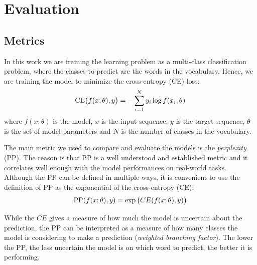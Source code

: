 
\section{Evaluation}
\label{sec:5_eval}
\subsection{Metrics}
In this work we are framing the learning problem as a multi-class classification problem, where the classes to predict are the words in the vocabulary. Hence, we are training the model to minimize the cross-entropy (CE) loss:
\begin{equation}
    \text{CE} \parenth[\big]{f(x; \theta), y} = -\sum_{i=1}^{N} y_i \log{f(x_i; \theta)}
\end{equation}
where $f(x; \theta)$ is the model, $x$ is the input sequence, $y$ is the target sequence, $\theta$ is the set of model parameters and $N$ is the number of classes in the vocabulary. 

The main metric we used to compare and evaluate the models is the \emph{perplexity} (PP). The reason is that PP is a well understood and established metric and it correlates well enough with the model performances on real-world tasks. Although the PP can be defined in multiple ways, it is convenient to use the definition of PP as the exponential of the cross-entropy (CE):
\begin{equation}
    \text{PP}(f(x; \theta), y) = \exp \parenth[\big]{CE(f(x; \theta), y)}
\end{equation}

While the $CE$ gives a measure of how much the model is uncertain about the prediction, the PP can be interpreted as a measure of how many classes the model is considering to make a prediction (\emph{weighted branching factor}). The lower the PP, the less uncertain the model is on which word to predict, the better it is performing.

